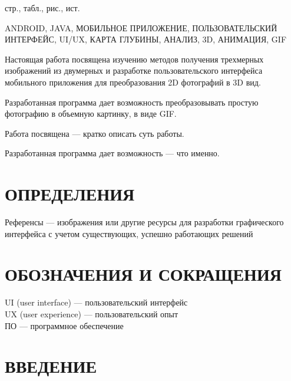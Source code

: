 \documentclass[a4paper,12pt]{article}
\newcounter{mycitecount}                                %
\begin{document}
 стр.,  табл.,  рис., \totalmycitecounts ист. 

ANDROID, JAVA, МОБИЛЬНОЕ ПРИЛОЖЕНИЕ, ПОЛЬЗОВАТЕЛЬСКИЙ ИНТЕРФЕЙС, UI/UX, КАРТА ГЛУБИНЫ, АНАЛИЗ, 3D, АНИМАЦИЯ, GIF

Настоящая работа посвящена изучению методов получения трехмерных изображений из двумерных и разработке пользовательского интерфейса мобильного приложения для преобразования 2D фотографий в 3D вид. 

Разработанная программа дает возможность преобразовывать простую фотографию в объемную картинку, в виде GIF.

Работа посвящена --- кратко описать суть работы.

Разработанная программа дает возможность --- что именно.

\pagebreak
\thispagestyle{empty}

\section*{\centering ОПРЕДЕЛЕНИЯ}

Референсы --- изображения или другие ресурсы для разработки графического интерфейса с учетом существующих, успешно работающих решений
 

\pagebreak

\section*{\centering ОБОЗНАЧЕНИЯ И СОКРАЩЕНИЯ}


UI (user interface) --- пользовательский интерфейс\\
UX (user experience) --- пользовательский опыт\\
ПО –-- программное обеспечение\\



\pagebreak



\tableofcontents

\pagebreak

\section*{\centering ВВЕДЕНИЕ}
\pagebreak
\end{document}
